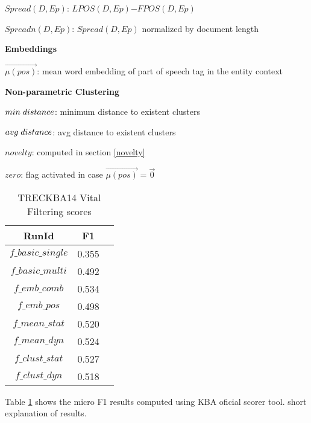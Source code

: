 \documentclass{article}
\begin{document}
\begin{itemize*}
\begin{itemize*}
\begin{itemize*}
            \item $Spread(D,Ep)$: $LPOS(D,Ep)\mathord{-}FPOS(D,Ep)$
            \item $Spreadn(D,Ep)$: $Spread(D,Ep)$ normalized by document length
        \end{itemize*}
    \end{itemize*}
  \item \textbf{Embeddings}
    \begin{itemize*}
        \item $\vec{\mu(pos)}$: mean word embedding of part of speech tag in the entity context
    \end{itemize*}
  \item \textbf{Non-parametric Clustering}
    \begin{itemize*}
        \item $min\hspace{1mm} distance$: minimum distance to existent clusters
        \item $avg\hspace{1 mm}distance$: avg distance to existent clusters
        \item $novelty$: computed in section \ref{novelty}
        \item $zero$: flag activated in case $\vec{\mu(pos)} = \vec{0}$
    \end{itemize*}
\end{itemize*}


\begin{table}[H]
\center
\begin{tabular}{|c|c|c|} \hline
\textbf{RunId} & \textbf{F1} \\ \hline\hline
$f\_basic\_single$ & 0.355 \\ \hline
$f\_basic\_multi$ & 0.492 \\ \hline
$f\_emb\_comb$ & 0.534 \\ \hline
$f\_emb\_pos$ & 0.498 \\ \hline
$f\_mean\_stat$ & 0.520 \\ \hline
$f\_mean\_dyn$ & 0.524 \\ \hline
$f\_clust\_stat$ & 0.527 \\ \hline
$f\_clust\_dyn$ & 0.518 \\ \hline
\end{tabular}
\caption{TRECKBA14 Vital Filtering scores}
\label{f1}
\end{table}

Table \ref{f1} shows the micro F1 results computed using KBA oficial scorer tool.
short explanation of results.
\end{document}
